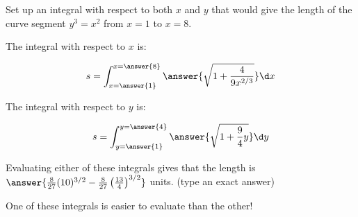 \documentclass{ximera}
\author{Jim Talamo}
\begin{document}
\begin{exercise}

Set up an integral with respect to both $x$ and $y$ that would give the length of the curve segment $y^3=x^2$ from $x=1$ to $x=8$.

The integral with respect to $x$ is:

\[
s= \int_{x=\answer{1}}^{x=\answer{8}} \answer{\sqrt{1+\frac{4}{9x^{2/3}}}} \d x
\]

The integral with respect to $y$ is:

\[
s= \int_{y=\answer{1}}^{y=\answer{4}} \answer{\sqrt{1+\frac{9}{4}y}} \d y
\]

Evaluating either of these integrals gives that the length is $\answer{\frac{8}{27} (10)^{3/2}-\frac{8}{27} \left(\frac{13}{4}\right)^{3/2}}$ units. (type an exact answer)

\begin{remark}
One of these integrals is easier to evaluate than the other!
\end{remark}
\end{exercise}
\end{document}
